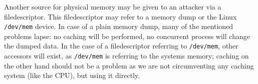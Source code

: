 Another source for physical memory may be given to an attacker via a
filedescriptor. This filedescriptor may refer to a memory dump or the Linux
\texttt{/dev/mem} device. In case of a plain memory dump, many of the mentioned
problems lapse: no caching will be performed, no concurrent process will change
the dumped data. In the case of a filedescriptor referring to \texttt{/dev/mem},
other accessors will exist, as \texttt{/dev/mem} is referring to the systems
memory; caching on the other hand should not be a problem as we are not
circumventing any caching system (like the CPU), but using it directly.



